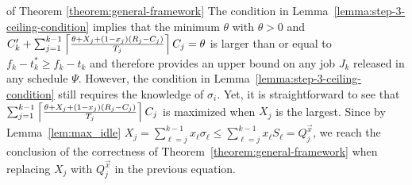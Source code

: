 \begin{appProof}{of Theorem \ref{theorem:general-framework}} 
The condition in Lemma~\ref{lemma:step-3-ceiling-condition} implies that the minimum $\theta$ with $\theta > 0$ and
$C_k'+\sum_{j=1}^{k-1} \left\lceil{\frac{\theta+X_j+(1-x_j)(R_j-C_j)}{T_j}}\right\rceil C_j = \theta$
 is larger than or equal to $f_k-t_k^* \geq f_k-t_k$ and therefore provides an upper bound on any job $J_k$ released in any schedule $\Psi$. 
However, the condition in Lemma~\ref{lemma:step-3-ceiling-condition}
still requires the knowledge of $\sigma_i$. Yet, it is straightforward to see
that $\sum_{j=1}^{k-1}
\left\lceil{\frac{\theta+X_j+(1-x_j)(R_j-C_j)}{T_j}}\right\rceil C_j$ is maximized when $X_j$ is the largest. Since by Lemma~\ref{lem:max_idle} $X_j = \sum_{\ell=j}^{k-1} x_\ell\sigma_\ell \leq \sum_{\ell=j}^{k-1} x_\ell S_\ell = Q_j^{\vec{x}}$, we reach the conclusion of the correctness
of Theorem~\ref{theorem:general-framework} when replacing $X_j$ with $Q_j^{\vec{x}}$ in the previous equation.
\end{appProof}


